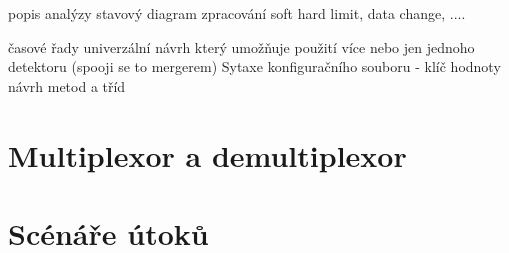  popis analýzy
  stavový diagram zpracování
  soft hard limit, data change, .... 
 
  časové řady
  univerzální návrh který umožňuje použití více nebo jen jednoho detektoru (spooji se to mergerem)
  Sytaxe konfiguračního souboru - klíč hodnoty
  návrh metod a tříd 
  
 \section{Multiplexor a demultiplexor}
 
 \section{Scénáře útoků}
